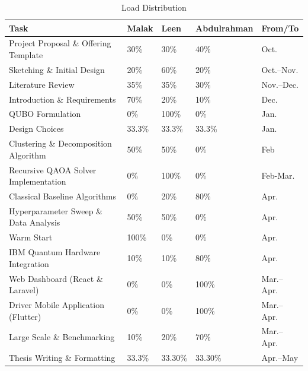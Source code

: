 \documentclass[a4paper]{report}
\begin{document}
{\begin{itemize}
\begin{table}[ht]
\centering
\caption{Load Distribution}
\label{tab:load_distribution}
\begin{tabular}{@{}lllll@{}}
\toprule
Task                                      & Malak & Leen & Abdulrahman & From/To       \\ \midrule
Project Proposal \& Offering Template     & 30\%  & 30\% & 40\%        & Oct.          \\
Sketching \& Initial Design               & 20\%  & 60\% & 20\%        & Oct.--Nov.    \\
Literature Review                         & 35\%  & 35\% & 30\%        & Nov.--Dec.    \\
Introduction \& Requirements              & 70\%  & 20\% & 10\%        & Dec.          \\
QUBO Formulation         & 0\%  & 100\% & 0\%        & Jan.          \\
Design Choices          & 33.3\%  & 33.3\% & 33.3\%        & Jan.          \\
Clustering \& Decomposition Algorithm       & 50\%     & 50\%   & 0\%         & Feb \\

Recursive QAOA Solver Implementation      & 0\%  & 100\% & 0\%        & Feb-Mar.    \\
Classical Baseline Algorithms             & 0\%  & 20\% & 80\%        & Apr.          \\
Hyperparameter Sweep \& Data Analysis     & 50\%  & 50\% & 0\%        & Apr.    \\
Warm Start      & 100\%  & 0\% & 0\%        & Apr.    \\
IBM Quantum Hardware Integration          & 10\%  & 10\% & 80\%        & Apr.          \\
Web Dashboard (React \& Laravel)          & 0\%  & 0\% & 100\%        & Mar.--Apr.    \\
Driver Mobile Application (Flutter)       & 0\%  & 0\% & 100\%        & Mar.--Apr.    \\
Large Scale \& Benchmarking                  &   10\%  & 20\% & 70\%        & Mar.--Apr.          \\
Thesis Writing \& Formatting              & 33.3\%  & 33.30\% & 33.30\%        & Apr.--May     \\ \bottomrule
\end{tabular}
\end{table}


\end{itemize}}
\end{document}

